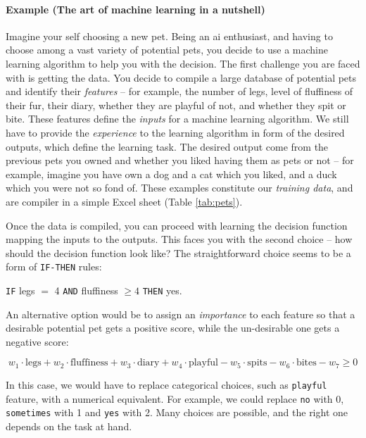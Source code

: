 
\paragraph{Example (The art of machine learning in a nutshell)} Imagine your self choosing a new pet.
Being an \gls{ai} enthusiast, and having to choose among a vast variety of potential pets, you decide to use a machine learning algorithm to help you with the decision.
The first challenge you are faced with  is getting the data.
You decide to compile a large database of potential pets and identify their \textit{features} -- for example, the number of legs, level of fluffiness of their fur, their diary, whether they are playful of not, and whether they spit or bite.
These features define the \textit{inputs} for a machine learning algorithm.
We still have to provide the \textit{experience} to the learning algorithm in form of the desired outputs, which define the learning task.
The desired output come from the previous pets you owned and whether you liked having them as pets or not -- for example, imagine you have own a dog and a cat which you liked, and a duck which you were not so fond of.
These examples constitute our \textit{training data}, and are compiler in a simple Excel sheet (Table \ref{tab:pets}).



Once the data is compiled, you can proceed with learning the decision function mapping the inputs to the outputs.
This faces you with the second choice -- how should the decision function look like?
The straightforward choice seems to be a form of \texttt{IF-THEN} rules:
\begin{center}
	\texttt{IF} legs $=$ 4 \texttt{AND} fluffiness $\geq 4$ \texttt{THEN} yes.
\end{center}
An alternative option would be to assign an \textit{importance} to each feature so that a desirable potential pet gets a positive score, while the un-desirable one gets a negative score:

$$ w_1 \cdot \text{legs} + w_2 \cdot \text{fluffiness} + w_3 \cdot \text{diary} + w_4 \cdot \text{playful} - w_5 \cdot \text{spits} - w_6 \cdot \text{bites} - w_7 \geq 0$$

In this case, we would have to replace categorical choices, such as \texttt{playful} feature, with a numerical equivalent.
For example, we could replace \texttt{no} with 0, \texttt{sometimes} with 1 and \texttt{yes} with 2.
Many choices are possible, and the right one depends on the task at hand.



